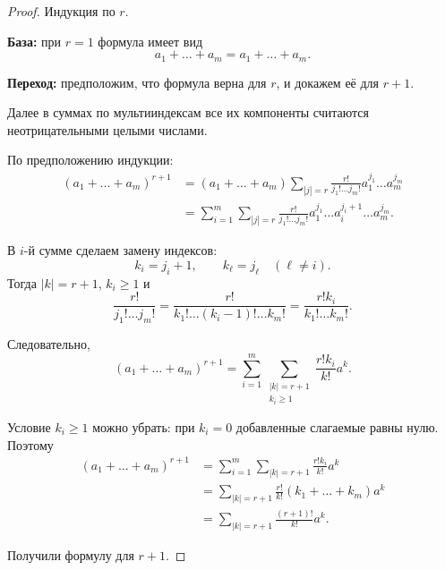 \begin{proof}
Индукция по $r$.

\textbf{База:} при $r=1$ формула имеет вид
\[
  a_1+\ldots+a_m=a_1+\ldots+a_m.
\]

\textbf{Переход:} предположим, что формула верна для $r$, и докажем её для $r+1$.

Далее в суммах по мультииндексам все их компоненты считаются неотрицательными целыми числами.

По предположению индукции:
\[
  \begin{aligned}
    (a_1+\ldots+a_m)^{r+1}
    &=(a_1+\ldots+a_m)
      \sum_{|j|=r}\frac{r!}{j_1!\ldots j_m!}
      a_1^{j_1}\ldots a_m^{j_m}\\
    &=\sum_{i=1}^{m}\sum_{|j|=r}
      \frac{r!}{j_1!\ldots j_m!}
      a_1^{j_1}\ldots a_i^{j_i+1}\ldots a_m^{j_m}.
  \end{aligned}
\]

В $i$-й сумме сделаем замену индексов:
\[
  k_i=j_i+1,\qquad k_\ell=j_\ell\quad(\ell\ne i).
\]
Тогда $|k|=r+1$, $k_i\ge1$ и
\[
  \frac{r!}{j_1!\ldots j_m!}
  =\frac{r!}{k_1!\ldots(k_i-1)!\ldots k_m!}
  =\frac{r!k_i}{k_1!\ldots k_m!}.
\]

Следовательно,
\[
  (a_1+\ldots+a_m)^{r+1}
  =\sum_{i=1}^{m}\sum_{\substack{|k|=r+1\\k_i\ge1}}
    \frac{r!k_i}{k!}a^k.
\]

Условие $k_i\ge1$ можно убрать: при $k_i=0$ добавленные слагаемые равны нулю.
Поэтому
\[
  \begin{aligned}
    (a_1+\ldots+a_m)^{r+1}
    &=\sum_{i=1}^{m}\sum_{|k|=r+1}\frac{r!k_i}{k!}a^k\\
    &=\sum_{|k|=r+1}\frac{r!}{k!}(k_1+\ldots+k_m)a^k\\
    &=\sum_{|k|=r+1}\frac{(r+1)!}{k!}a^k.
  \end{aligned}
\]

Получили формулу для $r+1$.
\end{proof}
